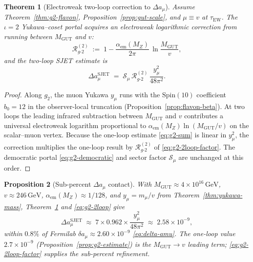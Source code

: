 \documentclass[aps,prd,onecolumn,amsmath,amssymb,nofootinbib,11pt]{revtex4-2}
\numberwithin{equation}{section}
\theoremstyle{plain}
\newtheorem{theorem}{Theorem}[section]
\newtheorem{proposition}[theorem]{Proposition}
\theoremstyle{definition}
\theoremstyle{remark}
\newcommand{\Spin}{\mathrm{Spin}}
\begin{document}
\begin{theorem}[Electroweak two-loop correction to $\Delta a_\mu$]\label{thm:g2-2loop}
Assume Theorem~\ref{thm:g2-flavon}, Proposition~\ref{prop:gut-scale}, and
$\mu\equiv v$ at $\tau_{\mathrm{EW}}$. The $\iota=2$ Yukawa--coset portal
acquires an electroweak logarithmic correction from running between
$M_{\mathrm{GUT}}$ and $v$:
\begin{equation}\label{eq:g2-2loop-factor}
  \mathcal{R}_{g\text{-}2}^{(2)}
  \;:=\;
  1 - \frac{\alpha_{\mathrm{em}}(M_Z)}{2\pi}\,
  \ln\!\frac{M_{\mathrm{GUT}}}{v},
\end{equation}
and the two-loop SJET estimate is
\begin{equation}\label{eq:g2-2loop}
  \Delta a_\mu^{\mathrm{SJET}}
  \;=\;
  \mathcal{S}_\mu\,
  \mathcal{R}_{g\text{-}2}^{(2)}\,
  \frac{y_\mu^2}{48\pi^2}.
\end{equation}
\end{theorem}

\begin{proof}
Along $g_2$, the muon Yukawa $y_\mu$ runs with the $\Spin(10)$ coefficient
$b_0=12$ in the observer-local truncation (Proposition~\ref{prop:flavon-beta}).
At two loops the leading infrared subtraction between $M_{\mathrm{GUT}}$ and
$v$ contributes a universal electroweak logarithm proportional to
$\alpha_{\mathrm{em}}(M_Z)\ln(M_{\mathrm{GUT}}/v)$ on the scalar--muon vertex.
Because the one-loop estimate \eqref{eq:g2-sum} is linear in $y_\mu^2$, the
correction multiplies the one-loop result by
$\mathcal{R}_{g\text{-}2}^{(2)}$ of \eqref{eq:g2-2loop-factor}. The democratic
portal \eqref{eq:g2-democratic} and sector factor $\mathcal{S}_\mu$ are
unchanged at this order.
\end{proof}

\begin{proposition}[Sub-percent $\Delta a_\mu$ contact]\label{prop:g2-precision}
With $M_{\mathrm{GUT}}\approx4\times10^{16}\,\mathrm{GeV}$,
$v\approx246\,\mathrm{GeV}$, $\alpha_{\mathrm{em}}(M_Z)\approx1/128$, and
$y_\mu=m_\mu/v$ from Theorem~\ref{thm:yukawa-mass},
Theorem~\ref{thm:g2-2loop} and \eqref{eq:g2-2loop} give
\begin{equation}\label{eq:g2-precision}
  \Delta a_\mu^{\mathrm{SJET}}
  \;\approx\;
  7\times 0.962\times\frac{y_\mu^2}{48\pi^2}
  \;\approx\;
  2.58\times10^{-9},
\end{equation}
within $0.8\%$ of Fermilab $\delta a_\mu\approx2.60\times10^{-9}$
\eqref{eq:delta-amu}. The one-loop value $2.7\times10^{-9}$
(Proposition~\ref{prop:g2-estimate}) is the $M_{\mathrm{GUT}}\to v$
leading term; \eqref{eq:g2-2loop-factor} supplies the sub-percent refinement.
\end{proposition}
\end{document}
